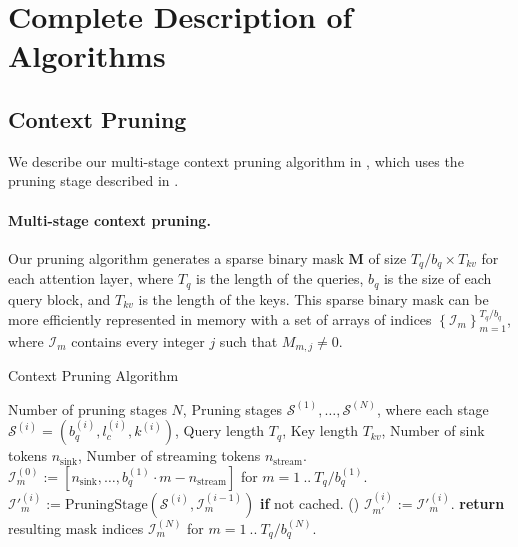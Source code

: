 \section{Complete Description of Algorithms}
\label{sec:algorithm}

\subsection{Context Pruning}
We describe our multi-stage context pruning algorithm in , which uses the pruning stage described in .

\paragraph{Multi-stage context pruning.} 
Our pruning algorithm generates a sparse binary mask $\bm{M}$ of size $T_q/b_q \times T_{kv}$ for each attention layer, where $T_q$ is the length of the queries, $b_q$ is the size of each query block, and $T_{kv}$ is the length of the keys. This sparse binary mask can be more efficiently represented in memory with a set of arrays of indices $\left\{ \mathcal{I}_m \right\}_{m=1}^{T_q/b_q}$, where $\mathcal{I}_m$ contains every integer $j$ such that $M_{m,j} \neq 0$.
\begin{algorithm}[H]
\caption{\ours Context Pruning Algorithm}\label{alg:mask_selection}
\begin{algorithmic}[1]
\INPUT Number of pruning stages $N$, Pruning stages $\mathcal{S}^{(1)}, \dots, \mathcal{S}^{(N)}$, where each stage $\mathcal{S}^{(i)} = (b_q^{(i)}, l_c^{(i)}, k^{(i)})$, Query length $T_q$, Key length $T_{kv}$, Number of sink tokens $n_\text{sink}$, Number of streaming tokens $n_\text{stream}$.
\STATE $\mathcal{I}^{(0)}_m := [n_\text{sink}, \dots, b_q^{(1)} \cdot m - n_\text{stream}]$ for $m = 1~..~T_q/b_q^{(1)}$. 
        \STATE $\mathcal{I}'^{(i)}_m := \text{PruningStage}(\mathcal{S}^{(i)}, \mathcal{I}^{(i-1)}_m)$ \textbf{if} not cached.  ()
            \STATE $\mathcal{I}^{(i)}_{m'} := \mathcal{I}'^{(i)}_m$. 
        \ENDFOR
    \ENDFOR
\ENDFOR
\STATE \textbf{return} resulting mask indices $\mathcal{I}^{(N)}_m$ for $m = 1~..~T_q/b_q^{(N)}$.
\end{algorithmic}
\end{algorithm}

